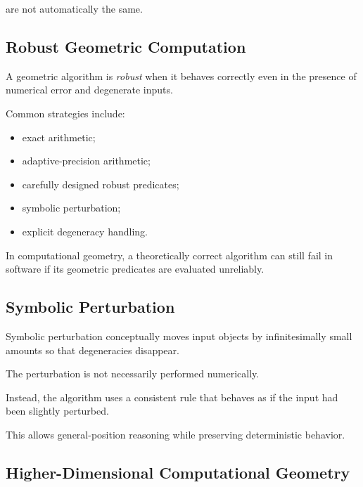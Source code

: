 are not automatically the same.

\subsection{Robust Geometric Computation}
\label{subsec:robust-geometric-computation}

A geometric algorithm is \emph{robust} when it behaves correctly even in
the presence of numerical error and degenerate inputs.

Common strategies include:

\begin{itemize}
    \item exact arithmetic;
    \item adaptive-precision arithmetic;
    \item carefully designed robust predicates;
    \item symbolic perturbation;
    \item explicit degeneracy handling.
\end{itemize}

\begin{importantbox}
In computational geometry, a theoretically correct algorithm can still fail
in software if its geometric predicates are evaluated unreliably.
\end{importantbox}

\subsection{Symbolic Perturbation}
\label{subsec:symbolic-perturbation}

Symbolic perturbation conceptually moves input objects by infinitesimally
small amounts so that degeneracies disappear.

The perturbation is not necessarily performed numerically.

Instead, the algorithm uses a consistent rule that behaves as if the input
had been slightly perturbed.

This allows general-position reasoning while preserving deterministic
behavior.

\subsection{Higher-Dimensional Computational Geometry}
\label{subsec:higher-dimensional-computational-geometry}

